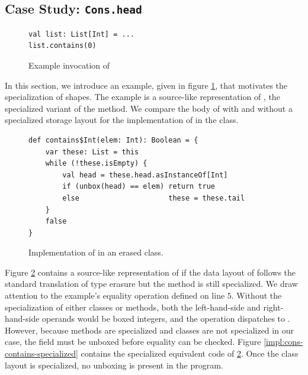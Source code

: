 \subsection{Case Study: \texttt{Cons.head}}

\begin{figure}[!htb]
\begin{verbatim}
val list: List[Int] = ...
list.contains(0)
\end{verbatim}
\caption{Example invocation of }
\label{example:list-contains-example}
\end{figure}

In this section, we introduce an example, given in figure \ref{example:list-contains-example}, that motivates the specialization of shapes.
The example is a source-like representation of , the specialized variant of the  method.
We compare the body of  with and without a specialized storage layout for the implementation of  in the  class.

\begin{figure}[!htb]
\begin{verbatim}
def contains$Int(elem: Int): Boolean = {
	var these: List = this
	while (!these.isEmpty) {
		val head = these.head.asInstanceOf[Int]
		if (unbox(head) == elem) return true
		else                     these = these.tail
	}
	false
}	
\end{verbatim}
\caption{Implementation of  in an erased  class.}
\label{impl:cons-contains-erased}
\end{figure}

Figure \ref{impl:cons-contains-erased} contains a source-like representation of  if the data layout of  follows the standard translation of type erasure but the method is still specialized.
We draw attention to the example's equality operation defined on line $5$.
Without the specialization of either classes or methods, both the left-hand-side and right-hand-side operands would be boxed integers, and the \scalainline{==} operation dispatches to .
However, because methods are specialized and classes are not specialized in our case, the  field must be unboxed before equality can be checked.
Figure \ref{impl:cons-contains-specialized} contains the specialized equivalent code of \ref{impl:cons-contains-erased}.
Once the class layout is specialized, no unboxing is present in the program.

